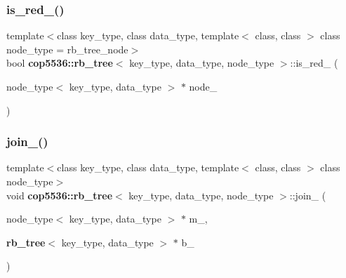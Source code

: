 \mbox{\label{classcop5536_1_1rb__tree_a5fd747730b2ac6130a61599f2d2522a6}} 
\subsubsection{is\_red\_()}
{\footnotesize\ttfamily template$<$class key\+\_\+type, class data\+\_\+type, template$<$ class, class $>$ class node\+\_\+type = rb\+\_\+tree\+\_\+node$>$ \\
bool \textbf{ cop5536\+::rb\+\_\+tree}$<$ key\+\_\+type, data\+\_\+type, node\+\_\+type $>$\+::is\+\_\+red\+\_\+ (\begin{DoxyParamCaption}\item[{node\+\_\+type$<$ key\+\_\+type, data\+\_\+type $>$ $\ast$}]{node\+\_\+ }\end{DoxyParamCaption})\hspace{0.3cm}{\ttfamily [inline]}}

\mbox{\label{classcop5536_1_1rb__tree_ac1820993f2e295c42de97af664503885}} 
\subsubsection{join\_()}
{\footnotesize\ttfamily template$<$class key\+\_\+type, class data\+\_\+type, template$<$ class, class $>$ class node\+\_\+type$>$ \\
void \textbf{ cop5536\+::rb\+\_\+tree}$<$ key\+\_\+type, data\+\_\+type, node\+\_\+type $>$\+::join\+\_\+ (\begin{DoxyParamCaption}\item[{node\+\_\+type$<$ key\+\_\+type, data\+\_\+type $>$ $\ast$}]{m\+\_\+,  }\item[{\textbf{ rb\+\_\+tree}$<$ key\+\_\+type, data\+\_\+type $>$ $\ast$}]{b\+\_\+ }\end{DoxyParamCaption})\hspace{0.3cm}{\ttfamily [inline]}}

